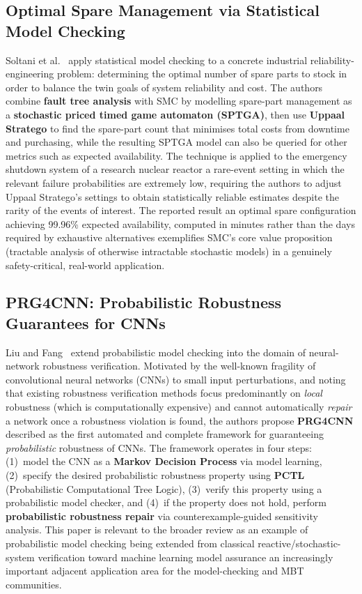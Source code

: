 \subsection{Optimal Spare Management via Statistical Model Checking}
\label{sec:lr_soltani}

Soltani et al.~\cite{soltani2023spare} apply statistical model checking
to a concrete industrial reliability-engineering problem: determining the
optimal number of spare parts to stock in order to balance the twin goals
of system reliability and cost.  The authors combine \textbf{fault tree
analysis} with SMC by modelling spare-part management as a
\textbf{stochastic priced timed game automaton (SPTGA)}, then use
\textbf{Uppaal Stratego} to find the spare-part count that minimises
total costs from downtime and purchasing, while the resulting SPTGA model
can also be queried for other metrics such as expected availability.  The
technique is applied to the emergency shutdown system of a research
nuclear reactor a rare-event setting in which the relevant failure
probabilities are extremely low, requiring the authors to adjust Uppaal
Stratego's settings to obtain statistically reliable estimates despite
the rarity of the events of interest.  The reported result an optimal
spare configuration achieving 99.96\% expected availability, computed in
minutes rather than the days required by exhaustive
alternatives exemplifies SMC's core value proposition (tractable
analysis of otherwise intractable stochastic models) in a genuinely
safety-critical, real-world application.

\subsection{PRG4CNN: Probabilistic Robustness Guarantees for CNNs}
\label{sec:lr_prg4cnn}

Liu and Fang~\cite{liu2025prg4cnn} extend probabilistic model checking
into the domain of neural-network robustness verification.  Motivated by
the well-known fragility of convolutional neural networks (CNNs) to
small input perturbations, and noting that existing robustness
verification methods focus predominantly on \emph{local} robustness
(which is computationally expensive) and cannot automatically
\emph{repair} a network once a robustness violation is found, the authors
propose \textbf{PRG4CNN} described as the first automated and complete
framework for guaranteeing \emph{probabilistic} robustness of CNNs.  The
framework operates in four steps: (1)~model the CNN as a
\textbf{Markov Decision Process} via model learning, (2)~specify the
desired probabilistic robustness property using \textbf{PCTL}
(Probabilistic Computational Tree Logic), (3)~verify this property using
a probabilistic model checker, and (4)~if the property does not hold,
perform \textbf{probabilistic robustness repair} via
counterexample-guided sensitivity analysis.  This paper is relevant to
the broader review as an example of probabilistic model checking being
extended from classical reactive/stochastic-system verification toward
machine learning model assurance an increasingly important adjacent
application area for the model-checking and MBT communities.


